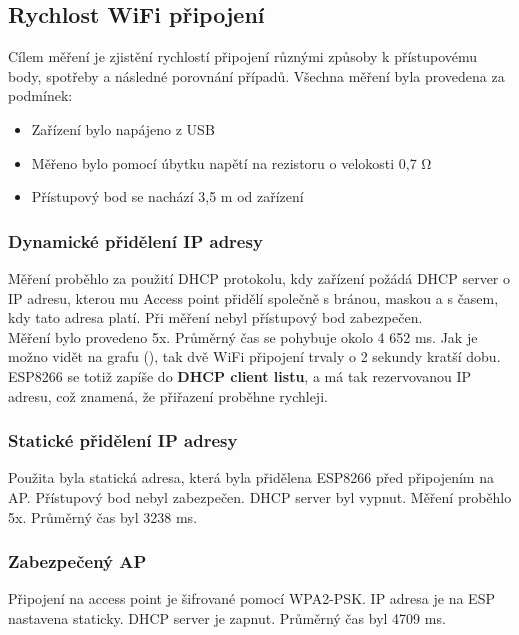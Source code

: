 \documentclass[a4paper, 12pt]{report}
\begin{document}
			\subsection{Rychlost WiFi připojení}
				Cílem měření je zjistění rychlostí připojení různými způsoby k přístupovému body, spotřeby a následné porovnání případů. Všechna měření byla provedena za podmínek:

				\begin{itemize}
					\item Zařízení bylo napájeno z USB
					\item Měřeno bylo pomocí úbytku napětí na rezistoru o velokosti 0,7 \si{\ohm}
					\item Přístupový bod se nachází 3,5 \si{m} od zařízení
				\end{itemize}

				\subsubsection{Dynamické přidělení IP adresy}
					Měření proběhlo za použití DHCP protokolu, kdy zařízení požádá DHCP server o IP adresu, kterou mu Access point přidělí společně s bránou, maskou a s časem, kdy tato adresa platí. Při měření nebyl přístupový bod zabezpečen.\\
					Měření bylo provedeno 5x. Průměrný čas se pohybuje okolo 4 652 \si{ms}. Jak je možno vidět na grafu (), tak dvě WiFi připojení trvaly o 2 sekundy kratší dobu. ESP8266 se totiž zapíše do \textbf{DHCP client listu}, a má tak rezervovanou IP adresu, což znamená, že přiřazení proběhne rychleji.

				\subsubsection{Statické přidělení IP adresy}
					Použita byla statická adresa, která byla přidělena ESP8266 před připojením na AP. Přístupový bod nebyl zabezpečen. DHCP server byl vypnut.
					Měření proběhlo 5x. Průměrný čas byl 3238 \si{ms}.\\

				\subsubsection{Zabezpečený AP}
						Připojení na access point je šifrované pomocí WPA2-PSK. IP adresa je na ESP nastavena staticky. DHCP server je zapnut.
						Průměrný čas byl 4709 \si{ms}.\\
\end{document}
